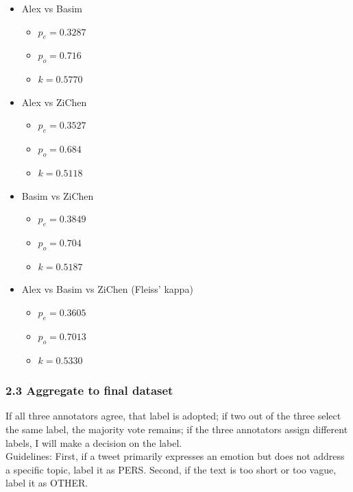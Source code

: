 \documentclass[11pt]{article}
\begin{document}
\begin{itemize}
        \item Alex vs Basim
                \begin{itemize}
                        \item $p_e = 0.3287$
                        \item $p_o = 0.716$
                        \item $k = 0.5770$
                \end{itemize}
        \item Alex vs ZiChen
                \begin{itemize}
                        \item $p_e = 0.3527$
                        \item $p_o = 0.684$
                        \item $k = 0.5118$
                \end{itemize}           
        \item Basim vs ZiChen
                \begin{itemize}
                        \item $p_e = 0.3849$
                        \item $p_o = 0.704$
                        \item $k = 0.5187$
                \end{itemize}   
        \item Alex vs Basim vs ZiChen (Fleiss’ kappa)
                \begin{itemize}
                        \item $p_e = 0.3605$
                        \item $p_o = 0.7013$
                        \item $k = 0.5330$
                \end{itemize}   
\end{itemize}              


\subsubsection*{2.3 Aggregate to final dataset}
\noindent If all three annotators agree, that label is adopted; if two out of the three select the same label, the majority vote remains; if the three annotators assign different labels, I will make a decision on the label.\\

\noindent Guidelines: First, if a tweet primarily expresses an emotion but does not address a specific topic, label it as PERS. Second, if the text is too short or too vague, label it as OTHER.
\end{document}
